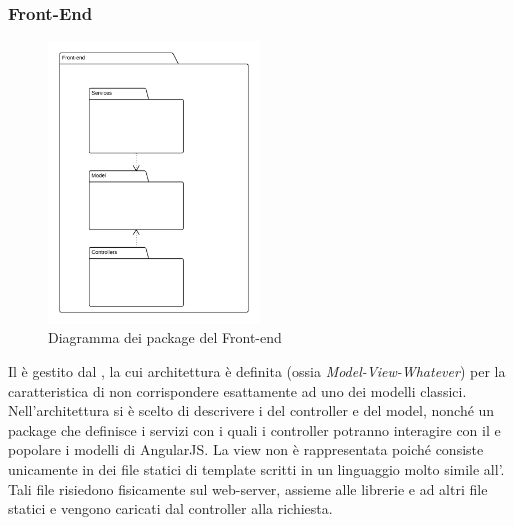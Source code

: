 \subsubsection{Front-End}

\begin{figure}[H]
\centering
\includegraphics[width=0.5\textwidth]{uml/Front-end-Diagramma dei packages.png}
\caption{Diagramma dei package del Front-end}
\end{figure}

Il  è gestito dal  , la cui architettura è definita  (ossia \textit{Model-View-Whatever}) per la caratteristica di non corrispondere esattamente ad uno dei modelli classici. Nell'architettura si è scelto di descrivere i  del controller e del model, nonché un package che definisce i servizi con i quali i controller potranno interagire con il  e popolare i modelli di AngularJS. La view non è rappresentata poiché consiste unicamente in dei file statici di template scritti in un linguaggio molto simile all'. Tali file risiedono fisicamente sul web-server, assieme alle librerie  e ad altri file statici e vengono caricati dal controller alla richiesta. 